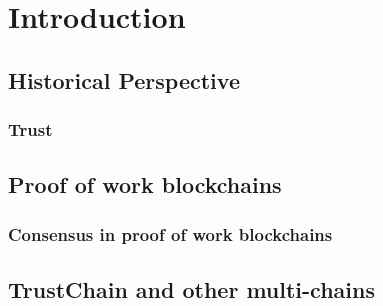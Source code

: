 \chapter{Introduction}
\section{Historical Perspective}

\subsection{Trust}

\section{Proof of work blockchains}

\subsection{Consensus in proof of work blockchains}

\section{TrustChain and other multi-chains}

